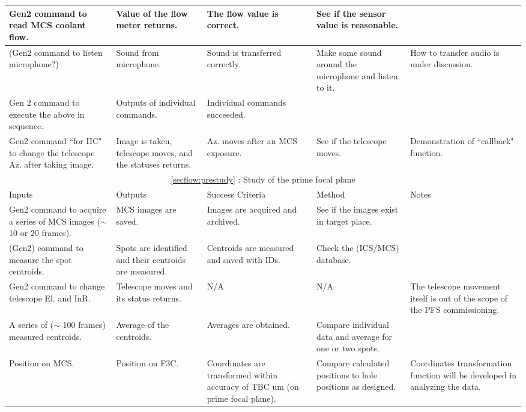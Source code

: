 \begin{landscape}
\begin{longtable}{p{42mm}|p{42mm}|p{40mm}|p{50mm}|p{35mm}}
Gen2 command to read MCS coolant flow. 	&  Value of the flow meter returns.	& The flow value is correct.	& See if the sensor value is reasonable. &  \\  \hline
(Gen2 command to listen microphone?) 	&  Sound from microphone.	& Sound is transferred correctly.	& Make some sound around the microphone and listen to it. & How to transfer audio is under discussion.  \\  \hline
Gen 2 command to execute the above in sequence. 	&  Outputs of individual commands.	& Individual commands succeeded.	&  	\\ \hline \hline
 \rowcolor[rgb]{0.94, 0.97, 1.0}
Gen2 command ``for IIC" to change the telescope Az. after taking image.	&  Image is taken, telescope moves, and the statuses returns. 	&  Az. moves after an MCS exposure.	& See if the telescope moves. &  Demonstration of ``callback" function. \\  \hline
\multicolumn{5}{c}{ \ref{secflow:prestudy} : Study of the prime focal plane } \\ \hline
Inputs	& Outputs & Success Criteria & Method & Notes \\ \arrayrulecolor[rgb]{0.63,0.79,0.95}\hline \hline \arrayrulecolor{black}
Gen2 command to acquire a series of MCS images ($\sim$ 10 or 20 frames). 	&  MCS images are saved.	& Images are acquired and archived. & See if the images exist in target place. &  \\  \hline
(Gen2) command to measure the spot centroids. 	&  Spots are identified and their centroids are measured.	& Centroids are measured and saved with IDs. & Check the (ICS/MCS) database. &  \\  \hline
Gen2 command to change telescope El. and InR.		&  Telescope moves and its status returns.	& N/A	& N/A & The telescope movement itself is out of the scope of the PFS commissioning.  \\  \hline
 \rowcolor[rgb]{0.94, 0.97, 1.0}
A series of ($\sim$ 100 frames) measured centroids. 	&  Average of the centroids.	& Averages are obtained. & Compare individual data and average for one or two spots. & \\  \hline
Position on MCS.  	&  Position on F3C.	& Coordinates are transformed within accuracy of TBC um (on prime focal plane). & Compare calculated positions to hole positions as designed. & Coordinates transformation function will be developed in analyzing the data. \\  \hline
\end{longtable}
\end{landscape}

